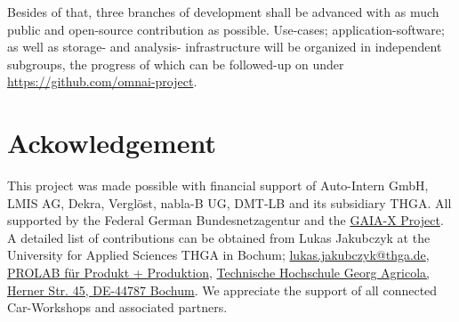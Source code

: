 Besides of that, three branches of development shall be advanced with as much public and open-source contribution as possible. 
Use-cases; application-software; as well as storage- and analysis- infrastructure will be organized in independent subgroups, 
the progress of which can be followed-up on under \url{https://github.com/omnai-project}.

\section{Ackowledgement}
This project was made possible with financial support of Auto-Intern GmbH, LMIS AG, Dekra, Verglöst, nabla-B UG, DMT-LB and its subsidiary THGA.
All supported by the Federal German Bundesnetzagentur and the \href{https://gaia-x.eu/}{GAIA-X Project}.
A detailed list of contributions can be obtained from Lukas Jakubczyk at the University for Applied Sciences THGA in Bochum; \href{mailto:lukas.jakubczyk@thga.de}{lukas.jakubczyk@thga.de}, \href{https://www.thga.de/forschung/maschinenbau-und-materialwissenschaften/labore/prolab-produkt-produktion}{PROLAB für Produkt + Produktion}, \href{https://maps.app.goo.gl/tQA3Qfn5f6gGqMHg8}{Technische Hochschule Georg Agricola, Herner Str. 45, DE-44787 Bochum}.
We appreciate the support of all connected Car-Workshops and associated partners. 




